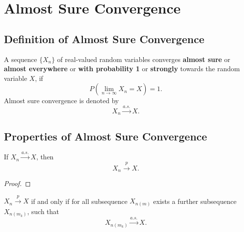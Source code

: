 \section{Almost Sure Convergence}

\subsection{Definition of Almost Sure Convergence}

\begin{definition}
    A sequence $\{X_n\}$ of real-valued random variables converges \textbf{almost sure} or \textbf{almost everywhere} or \textbf{with probability 1} or \textbf{strongly} towards the random variable $X$, if
    \begin{equation}
        P\left(\lim_{n\to\infty}X_n=X\right)=1.
    \end{equation}
    Almost sure convergence is denoted by
    \begin{equation}
        X_n \stackrel{a.s.}{\rightarrow} X.
    \end{equation}
\end{definition}

\begin{note}

\end{note}

\subsection{Properties of Almost Sure Convergence}

\begin{theorem}
    If $X_{n}\stackrel{a.s.}{\rightarrow}X$, then
    \begin{equation}
        X_{n}\stackrel{p}{\rightarrow}X.
    \end{equation}
\end{theorem}

\begin{proof}

\end{proof}

\begin{theorem}
    $X_n\stackrel{p}{\rightarrow}X$ if and only if for all subsequence $X_{n(m)}$ exists a further subsequence $X_{n(m_k)}$, such that
    \begin{equation}
        X_{n(m_k)}\stackrel{a.s.}{\rightarrow}X.
    \end{equation}
\end{theorem}

